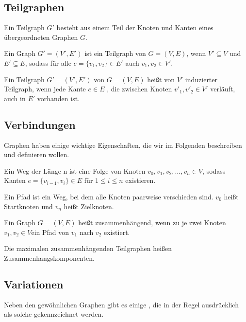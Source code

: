 \subsection{Teilgraphen}
	Ein Teilgraph $G'$ besteht aus einem Teil der Knoten und Kanten eines übergeordneten Graphen $G$.
	\begin{df}
	Ein Graph $ G' = (V', E')$ ist ein Teilgraph von $G = (V, E)$, wenn $V' \subseteq V$ und $E' \subseteq E$, sodass für alle $e = \{v_1, v_2\} \in E'$ auch $v_1, v_2 \in V'$.
	\end{df}
	\begin{df}
	Ein Teilgraph $ G' = (V', E')$ von $G = (V, E)$ heißt von $V'$ induzierter Teilgraph, wenn jede Kante $e \in E$ , die zwischen Knoten $v'_1,v'_2 \in V'$ verläuft, auch in $E'$ vorhanden ist.
	\end{df}

\subsection{Verbindungen}
Graphen haben einige wichtige Eigenschaften, die wir im Folgenden beschreiben und definieren wollen.



\begin{df}
Ein Weg der Länge n ist eine Folge von Knoten $v_0,v_1, v_2, \dotsc, v_n \in V$, sodass Kanten $e = \{v_{i-1},v_i\} \in E$ für $ 1 \leq i \leq n$ existieren.
\end{df}

\begin{df}
Ein Pfad ist ein Weg, bei dem alle Knoten paarweise verschieden sind.
$v_0$ heißt Startknoten und $v_n$ heißt Zielknoten.
\end{df}

\begin{df}
Ein Graph $G = (V,E)$ heißt zusammenhängend, wenn zu je zwei Knoten $v_1, v_2 \in V$ein Pfad von $v_1$ nach $v_2$ existiert.
\end{df}

\begin{df}
Die maximalen zusammenhängenden Teilgraphen heißen Zusammenhangskomponenten.
\end{df}

\subsection{Variationen}

Neben den gewöhnlichen Graphen gibt es einige , die in der Regel ausdrücklich als solche gekennzeichnet werden.


